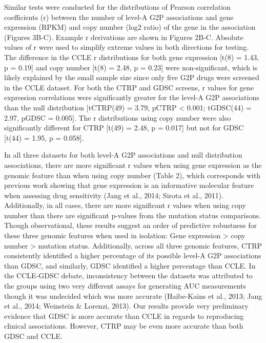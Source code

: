 \documentclass[man]{apa6}
\begin{document}
Similar tests were conducted for the distributions of Pearson
correlation coefficients (r) between the number of level-A G2P
associations and gene expression (RPKM) and copy number (log2 ratio) of
the gene in the association (Figures 3B-C). Example r derivations are
shown in Figures 2B-C. Absolute values of r were used to simplify
extreme values in both directions for testing. The difference in the
CCLE \textbar{}r\textbar{} distributions for both gene expression
{[}t(8) = 1.43, p = 0.19{]} and copy number {[}t(8) = 2.48, p = 0.23{]}
were non-significant, which is likely explained by the small sample size
since only five G2P drugs were screened in the CCLE dataset. For both
the CTRP and GDSC screens, \textbar{}r\textbar{} values for gene
expression correlations were significantly greater for the level-A G2P
associations than the null distribution {[}tCTRP(49) = 3.79, pCTRP
\textless{} 0.001; tGDSC(44) = 2.97, pGDSC = 0.005{]}. The
\textbar{}r\textbar{} distributions using copy number were also
significantly different for CTRP {[}t(49) = 2.48, p = 0.017{]} but not
for GDSC {[}t(44) = 1.95, p = 0.058{]}.

In all three datasets for both level-A G2P associations and null
distribution associations, there are more significant
\textbar{}r\textbar{} values when using gene expression as the genomic
feature than when using copy number (Table 2), which corresponds with
previous work showing that gene expression is an informative molecular
feature when assessing drug sensitivity (Jang et al., 2014; Sirota et
al., 2011). Additionally, in all cases, there are more significant r
values when using copy number than there are significant p-values from
the mutation status comparisons. Though observational, these results
suggest an order of predictive robustness for these three genomic
features when used in isolation: Gene expression \textgreater{} copy
number \textgreater{} mutation status. Additionally, across all three
genomic features, CTRP consistently identified a higher percentage of
its possible level-A G2P associations than GDSC, and similarly, GDSC
identified a higher percentage than CCLE. In the CCLE-GDSC debate,
inconsistency between the datasets was attributed to the groups using
two very different assays for generating AUC measurements though it was
undecided which was more accurate (Haibe-Kains et al., 2013; Jang et
al., 2014; Weinstein \& Lorenzi, 2013). Our results provide very
preliminary evidence that GDSC is more accurate than CCLE in regards to
reproducing clinical associations. However, CTRP may be even more
accurate than both GDSC and CCLE.
\end{document}
